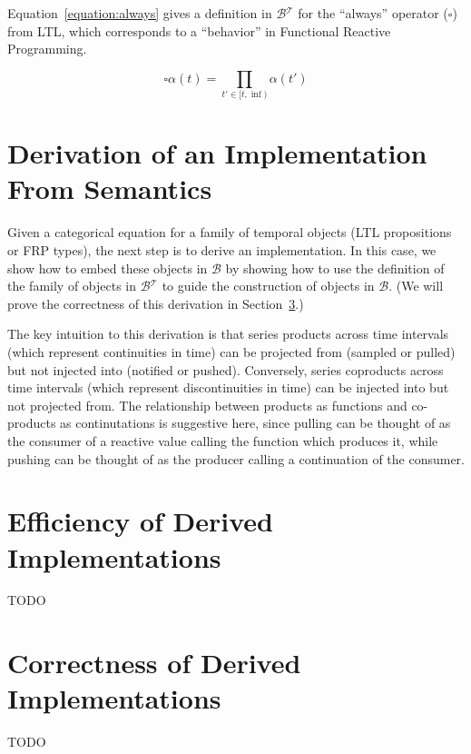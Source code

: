 \documentclass{article}
\newcommand{\lambdacat}[0]{\mathcal{B}}
\newcommand{\timecat}[0]{\mathcal{T}}
\newcommand{\fancat}[0]{\lambdacat{}^\timecat{}}
\begin{document}
Equation~\ref{equation:always} gives a definition in $\fancat$ for the ``always'' operator ($\square$) from LTL, which corresponds to a ``behavior'' in Functional Reactive Programming.

\begin{equation}
\label{equation:always}
\square\alpha (t) = \prod_{t' \in [t,\inf)} \alpha(t')
\end{equation}

\section{Derivation of an Implementation From Semantics}
\label{section:derivation}

Given a categorical equation for a family of temporal objects (LTL propositions or FRP types), the next step is to derive an implementation. In this case, we show how to embed these objects in $\lambdacat{}$ by showing how to use the definition of the family of objects in $\fancat$ to guide the construction of objects in $\lambdacat$. (We will prove the correctness of this derivation in Section~\ref{section:correctness}.)

The key intuition to this derivation is that series products across time intervals (which represent continuities in time) can be projected from (sampled or pulled) but not injected into (notified or pushed). Conversely, series coproducts across time intervals (which represent discontinuities in time) can be injected into but not projected from. The relationship between products as functions and co-products as continutations is suggestive here, since pulling can be thought of as the consumer of a reactive value calling the function which produces it, while pushing can be thought of as the producer calling a continuation of the consumer.

\section{Efficiency of Derived Implementations}
\label{section:efficiency}

TODO

\section{Correctness of Derived Implementations}
\label{section:correctness}

TODO



\end{document}
